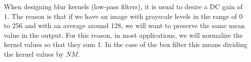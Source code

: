 When designing blur kernels (low-pass filters), it is usual to desire a DC gain of 1. The reason is that if we have an image with grayscale levels in the range of 0 to 256 and with an average around 128, we will want to preserve the same mean value in the output. For this reason, in most applications, we will normalize the kernel values so that they sum 1. In the case of the box filter this means dividing the kernel values by $NM$.

%


